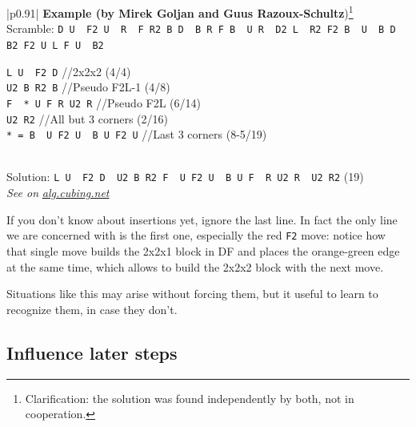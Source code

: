 \documentclass[11pt,a4paper]{book}
\newcommand{\p}{\textquotesingle}
\newcommand{\m}{\texttt}
\newcommand{\ps}{\p\,\,}
\newcommand{\comment}[1]{{\color{gray}\quad//#1}}
\begin{document}
\bigskip
\begin{tabular}{|p{}|}
\hline
\textbf{Example (by Mirek Goljan and Guus Razoux-Schultz})\footnote{Clarification: the solution was found independently by both, not in cooperation.}\\
\hline
Scramble: \m{D U\ps F2 U\ps R\ps F R2 B D\ps B R F B\ps U R\ps D2 L\ps R2 F2 B\ps U\ps B D B2 F2 U L F U\ps B2}\\
\hline
\begin{minipage}[l]{0.650\textwidth}
\m{L U\ps {\color{red}F2} D\p} \comment{2x2x2 (4/4)}\\
\m{U2 B R2 B} \comment{Pseudo F2L-1 (4/8)}\\
\m{F\ps * U F R U2 R\p} \comment{Pseudo F2L (6/14)}\\
\m{U2 R2} \comment{All but 3 corners (2/16)}\\
\m{* = B\ps U F2 U\ps B U F2 U\p} \comment{Last 3 corners (8-5/19)}
\end{minipage}
\begin{minipage}[c]{0.25\textwidth}

\end{minipage}\\
\hline
Solution: \m{L U\ps F2 D\ps U2 B R2 F\ps U F2 U\ps B U F\ps R U2 R\ps U2 R2} (19)\\
\hline
\emph{See on }\href{https://alg.cubing.net/?setup=D_U-_F2_U-_R-_F_R2_B_D-_B_R_F_B-_U_R-_D2_L-_R2_F2_B-_U-_B_D_B2_F2_U_L_F_U-_B2&alg=L_U-_F2_D-_\%2F\%2F2x2x2_(4\%2F4)\%0AU2_B_R2_B_\%2F\%2FPseudo_F2L\%26\%2345\%3B1_(4\%2F8)\%0AF-_(B-_U_F2_U-_B_U_F2_U-)_U_F_R_U2_R-_\%2F\%2FPseudo_F2L_(6\%2F14)\%0AU2_R2_\%2F\%2FAll_but_3_corners_(2\%2F16)}{\emph{alg.cubing.net}}\\
\hline
\end{tabular}
\bigskip

If you don't know about insertions yet, ignore the last line. In fact the only line we are concerned with is the first one, especially the red \m{F2} move: notice how that single move builds the 2x2x1 block in DF and places the orange-green edge at the same time, which allows to build the 2x2x2 block with the next move.

Situations like this may arise without forcing them, but it useful to learn to recognize them, in case they don't.

\subsection{Influence later steps}
\end{document}
